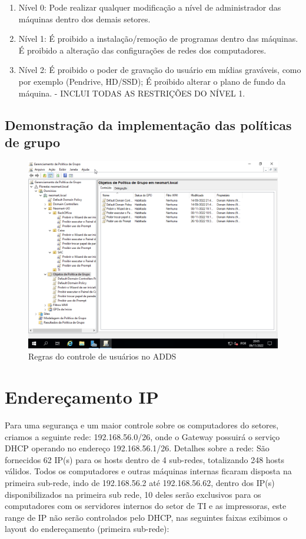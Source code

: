 \documentclass[12pt]{article}
\begin{document}
\begin{enumerate}
    \item Nível 0: Pode realizar qualquer modificação a nível de administrador das máquinas dentro dos demais setores.
    \item Nível 1: É proibido a instalação/remoção de programas dentro das máquinas. É proibido a alteração das configurações de redes dos computadores.
    \item Nível 2: É proibido o poder de gravação do usuário em mídias graváveis, como por exemplo (Pendrive, HD/SSD); É proibido alterar o plano de fundo da máquina. - INCLUI TODAS AS RESTRIÇÕES DO NÍVEL 1.
\end{enumerate}

\subsection{Demonstração da implementação das políticas de grupo}

\begin{figure}[ht]
\centering
\includegraphics[height=0.5\textwidth]{adds-regras.png}
\caption{Regras do controle de usuários no ADDS}
\label{fig:adds-pastas}
\end{figure}

\section{Endereçamento IP}
Para uma segurança e um maior controle sobre os computadores do setores, criamos a seguinte rede: 192.168.56.0/26, onde o Gateway possuirá o serviço DHCP operando no endereço 192.168.56.1/26.
Detalhes sobre a rede: São fornecidos 62 IP(s) para os hosts dentro de 4 sub-redes, totalizando 248 hosts válidos. Todos os computadores e outras máquinas internas ficaram disposta na primeira sub-rede, indo de 192.168.56.2 até 192.168.56.62, dentro dos IP(s) disponibilizados na primeira sub rede, 10 deles serão exclusivos para os computadores com os servidores internos do setor de TI e as impressoras, este range de IP não serão controlados pelo DHCP, nas seguintes faixas exibimos o layout do endereçamento (primeira sub-rede):
\end{document}
